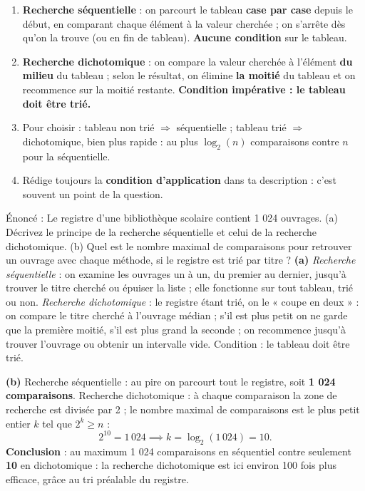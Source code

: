 \documentclass[11pt]{article}
\begin{document}
\begin{methode}
\begin{enumerate}
  \item \textbf{Recherche séquentielle} : on parcourt le tableau \textbf{case par case} depuis le début, en comparant chaque élément à la valeur cherchée ; on s'arrête dès qu'on la trouve (ou en fin de tableau). \textbf{Aucune condition} sur le tableau.
  \item \textbf{Recherche dichotomique} : on compare la valeur cherchée à l'élément \textbf{du milieu} du tableau ; selon le résultat, on élimine \textbf{la moitié} du tableau et on recommence sur la moitié restante. \textbf{Condition impérative : le tableau doit être trié.}
  \item Pour choisir : tableau non trié $\Rightarrow$ séquentielle ; tableau trié $\Rightarrow$ dichotomique, bien plus rapide : au plus $\log_2(n)$ comparaisons contre $n$ pour la séquentielle.
  \item Rédige toujours la \textbf{condition d'application} dans ta description : c'est souvent un point de la question.
\end{enumerate}
\end{methode}

\begin{exoresolu}
Énoncé : Le registre d'une bibliothèque scolaire contient 1 024 ouvrages. (a) Décrivez le principe de la recherche séquentielle et celui de la recherche dichotomique. (b) Quel est le nombre maximal de comparaisons pour retrouver un ouvrage avec chaque méthode, si le registre est trié par titre ?
\tcblower
\textbf{(a)} \emph{Recherche séquentielle} : on examine les ouvrages un à un, du premier au dernier, jusqu'à trouver le titre cherché ou épuiser la liste ; elle fonctionne sur tout tableau, trié ou non. \emph{Recherche dichotomique} : le registre étant trié, on le « coupe en deux » : on compare le titre cherché à l'ouvrage médian ; s'il est plus petit on ne garde que la première moitié, s'il est plus grand la seconde ; on recommence jusqu'à trouver l'ouvrage ou obtenir un intervalle vide. Condition : le tableau doit être trié.

\textbf{(b)} Recherche séquentielle : au pire on parcourt tout le registre, soit \textbf{1 024 comparaisons}. Recherche dichotomique : à chaque comparaison la zone de recherche est divisée par 2 ; le nombre maximal de comparaisons est le plus petit entier $k$ tel que $2^k \geq n$ :
\[ 2^{10} = 1\,024 \implies k = \log_2(1\,024) = 10. \]
\textbf{Conclusion} : au maximum 1 024 comparaisons en séquentiel contre seulement \textbf{10} en dichotomique : la recherche dichotomique est ici environ 100 fois plus efficace, grâce au tri préalable du registre.
\end{exoresolu}
\end{document}
